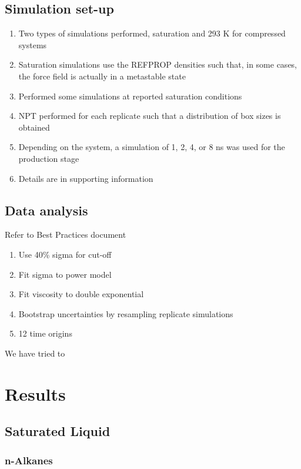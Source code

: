 \documentclass[11pt,a4paper]{article}
\begin{document}
\subsection{Simulation set-up}

\begin{enumerate}
	\item Two types of simulations performed, saturation and 293 K for compressed systems
	\item Saturation simulations use the REFPROP densities such that, in some cases, the force field is actually in a metastable state
	\item Performed some simulations at reported saturation conditions
	\item NPT performed for each replicate such that a distribution of box sizes is obtained
	\item Depending on the system, a simulation of 1, 2, 4, or 8 ns was used for the production stage
	\item Details are in supporting information
\end{enumerate}

\subsection{Data analysis}

Refer to Best Practices document

\begin{enumerate}
	\item Use 40\% sigma for cut-off
	\item Fit sigma to power model
	\item Fit viscosity to double exponential
	\item Bootstrap uncertainties by resampling replicate simulations
	\item 12 time origins
\end{enumerate}

We have tried to 

\section{Results}

\subsection{Saturated Liquid}

\subsubsection{n-Alkanes}
\end{document}
